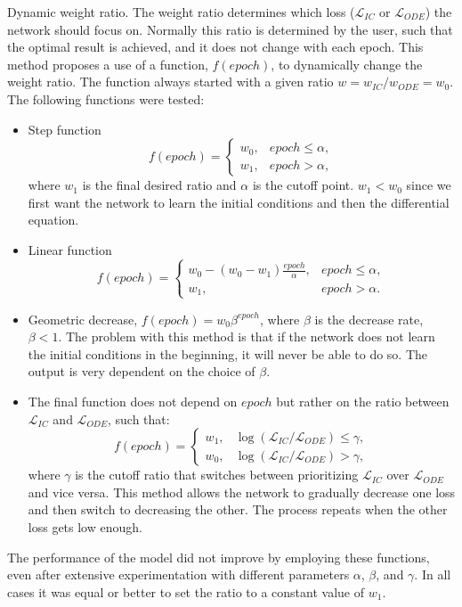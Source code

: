 \documentclass[10pt]{article}
\begin{document}
Dynamic weight ratio. The weight ratio determines which loss ($\mathcal{L}_{IC}$ or $\mathcal{L}_{ODE}$) the network should focus on. Normally this ratio is determined by the user, such that the optimal result is achieved, and it does not change with each epoch. This method proposes a use of a function, $f(epoch)$, to dynamically change the weight ratio. The function always started with a given ratio $w = w_{IC}/w_{ODE} = w_0$. The following functions were tested:
\begin{itemize}
    \item Step function
    \begin{equation*}
        f(epoch) = \begin{cases}
    w_0, & epoch \leq \alpha, \\
    w_1, & epoch > \alpha,
    \end{cases}
    \end{equation*}
    where $w_1$ is the final desired ratio and $\alpha$ is the cutoff point. $w_1 < w_0$ since we first want the network to learn the initial conditions and then the differential equation.
    \item Linear function
    \begin{equation*}
        f(epoch) = \begin{cases}
    w_0-(w_0 - w_1)\frac{epoch}{\alpha}, & epoch \leq \alpha, \\
    w_1, & epoch > \alpha.
    \end{cases}
    \end{equation*}
    \item Geometric decrease, $f(epoch)=w_0 \beta^{epoch}$, where $\beta$ is the decrease rate, $\beta < 1$. The problem with this method is that if the network does not learn the initial conditions in the beginning, it will never be able to do so. The output is very dependent on the choice of $\beta$.
    \item The final function does not depend on $epoch$ but rather on the ratio between $\mathcal{L}_{IC}$ and $\mathcal{L}_{ODE}$, such that:
    \begin{equation*}
        f(epoch) = \begin{cases}
    w_1, & \log(\mathcal{L}_{IC}/\mathcal{L}_{ODE}) \leq \gamma, \\
    w_0, & \log(\mathcal{L}_{IC}/\mathcal{L}_{ODE}) > \gamma,
    \end{cases}
    \end{equation*}
    where $\gamma$ is the cutoff ratio that switches between prioritizing $\mathcal{L}_{IC}$ over $\mathcal{L}_{ODE}$ and vice versa. This method allows the network to gradually decrease one loss and then switch to decreasing the other. The process repeats when the other loss gets low enough.
\end{itemize}
The performance of the model did not improve by employing these functions, even after extensive experimentation with different parameters $\alpha$, $\beta$, and $\gamma$. In all cases it was equal or better to set the ratio to a constant value of $w_1$.
\end{document}
